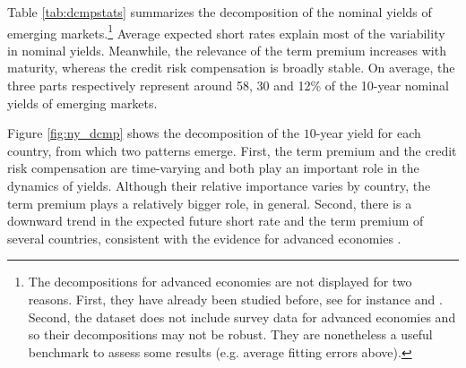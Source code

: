 {Table \ref{tab:dcmpstats} summarizes the decomposition of the nominal yields of emerging markets.\footnote{ The decompositions for advanced economies are not displayed for two reasons. First, they have already been studied before, see for instance \cite{Wright:2011} and \cite{ACDM:2019}. Second, the dataset does not include survey data for advanced economies and so their decompositions may not be robust. They are nonetheless a useful benchmark to assess some results (e.g. average fitting errors above).} %
Average expected short rates explain most of the variability in nominal yields. %
Meanwhile, the relevance of the term premium increases with maturity, whereas the credit risk compensation is broadly stable. %
On average, the three parts respectively %
represent around 58, 30 and 12\% of the 10-year nominal yields of emerging markets.

Figure \ref{fig:ny_dcmp} shows the decomposition of the \(10\)-year yield for each country, from which two patterns emerge. 
First, the term premium and the credit risk compensation are time-varying and both play an important role in the dynamics of yields.
Although their relative importance varies by country, %
the term premium plays a relatively bigger role, in general.
Second, there is a downward trend in the expected future short rate %
and the term premium of several countries, consistent with the evidence for advanced economies \citep{Wright:2011,ACDM:2019}.

}
